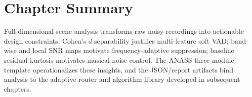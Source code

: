 \section{Chapter Summary}
\label{sec:scene_summary}

Full-dimensional scene analysis transforms raw noisy recordings into actionable design constraints. Cohen's $d$ separability justifies multi-feature soft VAD; band-wise and local SNR maps motivate frequency-adaptive suppression; baseline residual kurtosis motivates musical-noise control. The ANASS three-module template operationalizes these insights, and the JSON/report artifacts bind analysis to the adaptive router and algorithm library developed in subsequent chapters.

